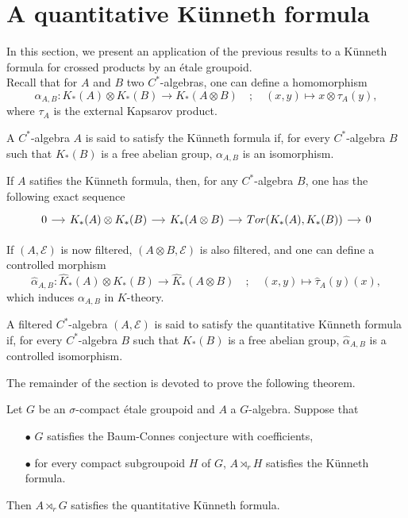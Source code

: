 \section{A quantitative Künneth formula}

In this section, we present an application of the previous results to a Künneth formula for crossed products by an étale groupoid.\\ 

Recall that for $A$ and $B$ two $C^*$-algebras, one can define a homomorphism
\[\alpha_{A,B} : K_*(A)\otimes K_*(B)\rightarrow K_*(A\otimes B) \quad ; \quad (x,y)\mapsto x\otimes   \tau_A(y),\]
where $\tau_A$ is the external Kapsarov product.

\begin{definition}
A $C^*$-algebra $A$ is said to satisfy the Künneth formula if, for every $C^*$-algebra $B$ such that $K_*(B)$ is a free abelian group, $\alpha_{A,B}$ is an isomorphism.
\end{definition}

If $A$ satifies the Künneth formula, then, for any $C^*$-algebra $B$, one has the following exact sequence
\[\begin{tikzcd}[column sep = small] 0 \arrow{r} & K_*(A)\otimes K_*(B)\arrow{r} & K_*(A\otimes B) \arrow{r} & Tor(K_*(A),K_*(B))\arrow{r} & 0 \end{tikzcd}\]

If $(A,\mathcal E)$ is now filtered, $(A\otimes B,\mathcal E)$ is also filtered, and one can define a controlled morphism
\[\hat\alpha_{A,B} : \hat K_*(A)\otimes K_*(B)\rightarrow \hat K_*(A\otimes B) \quad ; \quad (x,y)\mapsto \hat\tau_A(y)(x),\]
which induces $\alpha_{A,B}$ in $K$-theory. \\

\begin{definition}
A filtered $C^*$-algebra $(A,\mathcal E)$ is said to satisfy the quantitative Künneth formula if, for every $C^*$-algebra $B$ such that $K_*(B)$ is a free abelian group, $\hat\alpha_{A,B}$ is a controlled isomorphism.
\end{definition}

The remainder of the section is devoted to prove the following theorem.

\begin{thm}\label{Kunneth}
Let $G$ be an $\sigma$-compact étale groupoid and $A$ a $G$-algebra. Suppose that 
\begin{itemize}
\item[$\bullet$] $G$ satisfies the Baum-Connes conjecture with coefficients,
\item[$\bullet$] for every compact subgroupoid $H$ of $G$, $A\rtimes_r H$ satisfies the Künneth formula.
\end{itemize} 
Then $A\rtimes_r G$ satisfies the quantitative Künneth formula.
\end{thm}

